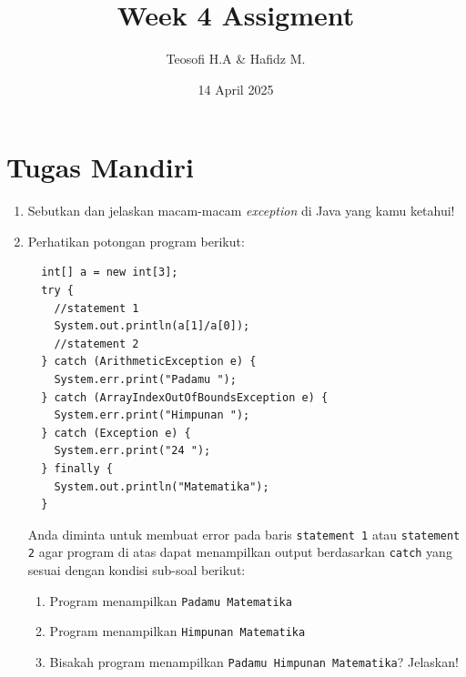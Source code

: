 \documentclass{article}
\title{\textbf{Week 4 Assigment}}
\date{14 April 2025}
\author{Teosofi H.A \& Hafidz M.}
\begin{document}
  \maketitle
  \section*{Tugas Mandiri}
  \begin{enumerate}
    \item Sebutkan dan jelaskan macam-macam \textit{exception} di Java yang kamu ketahui!
    \item Perhatikan potongan program berikut:
    \begin{verbatim}
  int[] a = new int[3];
  try {
    //statement 1
    System.out.println(a[1]/a[0]);
    //statement 2
  } catch (ArithmeticException e) {
    System.err.print("Padamu ");
  } catch (ArrayIndexOutOfBoundsException e) {
    System.err.print("Himpunan ");
  } catch (Exception e) {
    System.err.print("24 ");
  } finally {
    System.out.println("Matematika");
  }
    \end{verbatim}
    Anda diminta untuk membuat error pada baris \texttt{statement 1} atau \texttt{statement 2} agar program di atas dapat menampilkan output berdasarkan \texttt{catch} yang sesuai dengan kondisi sub-soal berikut:
    \begin{enumerate}
      \item Program menampilkan \texttt{Padamu Matematika}
      \item Program menampilkan \texttt{Himpunan Matematika}
      \item Bisakah program menampilkan \texttt{Padamu Himpunan Matematika}? Jelaskan!
    \end{enumerate}
  \end{enumerate}
\end{document}
